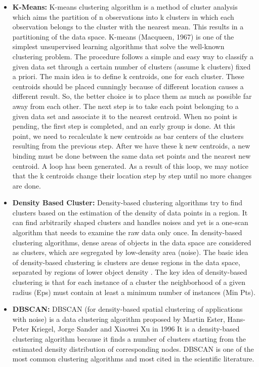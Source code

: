 \begin{itemize}
\item    \textbf{K-Means:}
K-means clustering algorithm \cite{HitchcockKmeans} is a method of cluster analysis which aims the partition of n observations into k clusters in which each observation belongs to the cluster with the nearest mean. This results in a partitioning of the data space. K-means (Macqueen, 1967) is one of the simplest unsupervised learning algorithms that solve the well-known clustering problem. The procedure follows a simple and easy way to classify a given data set through a certain number of clusters (assume k clusters) fixed a priori. The main idea is to define k centroids, one for each cluster. These centroids should be placed cunningly because of different location causes a different result. So, the better choice is to place them as much as possible far away from each other. The next step is to take each point belonging to a given data set and associate it to the nearest centroid. When no point is pending, the first step is completed, and an early group is done. At this point, we need to recalculate k new centroids as bar centers of the clusters resulting from the previous step. After we have these k new centroids, a new binding must be done between the same data set points and the nearest new centroid. A loop has been generated. As a result of this loop, we may notice that the k centroids change their location step by step until no more changes are done.

 
\item    \textbf{Density Based Cluster:}
Density-based clustering algorithms \cite{WekaCC} try to find clusters based on the estimation of the density of data points in a region.
It can find arbitrarily shaped clusters and handles noises and yet is a one-scan algorithm that needs to examine the raw data only once. In density-based clustering algorithms, dense areas of objects in the data space are considered as clusters, which are segregated by low-density area (noise). The basic idea of density-based clustering is clusters are dense regions in the data space, separated by regions of lower object density \cite{WEKATalankiDensity}.
The key idea of density-based clustering is that for each instance of a cluster the neighborhood of a given radius (Eps) must contain at least a minimum number of instances (Min Pts).

\item    \textbf{DBSCAN:}
DBSCAN (for density-based spatial clustering of applications with noise) is a data clustering algorithm proposed by Martin Ester, Hans-Peter Kriegel, Jorge Sander and Xiaowei Xu in 1996 It is a density-based clustering algorithm because it finds a number of clusters starting from the estimated density distribution of corresponding nodes. DBSCAN \cite{Kisilevich2010PDBSCANAD} is one of the most common clustering algorithms and most cited in the scientific literature.
\end{itemize}

